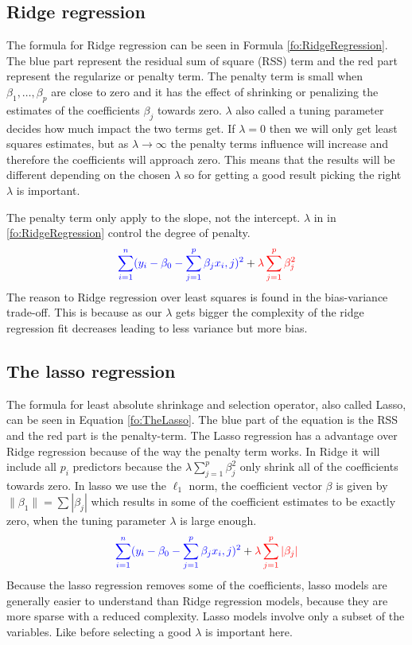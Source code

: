 \subsection{Ridge regression}
The formula for Ridge regression can be seen in Formula \ref{fo:RidgeRegression}. The blue part represent the residual sum of square (RSS) term and the red part represent the regularize or penalty term. The penalty term is small when $\beta_1, \ldots ,\beta_p$ are close to zero and it has the effect of shrinking or penalizing the estimates of the coefficients $\beta_j$ towards zero. $\lambda$ also called a tuning parameter decides how much impact the two terms get. If $\lambda = 0$ then we will only get least squares estimates, but as $ \lambda \to \infty$ the penalty terms influence will increase and therefore the coefficients will approach zero. This means that the results will be different depending on the chosen $\lambda$ so for getting a good result picking the right $\lambda$ is important.

\noindent The penalty term only apply to the slope, not the intercept. $\lambda$ in in \ref{fo:RidgeRegression} control the degree of penalty.
\begin{align}\label{fo:RidgeRegression}
\color{blue} \sum_{i=1}^{n} ( y_i - \beta_0 - \sum_{j=1}^{p} \beta_j x_i,j )^2 \color{black} + \color{red} \lambda \sum_{j=1}^{p} \beta^2_j 
\end{align}
The reason to Ridge regression over least squares is found in the bias-variance
trade-off. This is because as our $\lambda$ gets bigger the complexity of the ridge regression fit decreases leading to less variance but more bias.

\subsection{The lasso regression}
The formula for least absolute shrinkage and selection operator, also called Lasso, can be seen in Equation \ref{fo:TheLasso}. The blue part of the equation is the RSS and the red part is the penalty-term. The Lasso regression has a advantage over Ridge regression because of the way the penalty term works. In Ridge it will include all $p_i$ predictors because the $\lambda \sum_{j=1}^{p} \beta^2_j$ only shrink all of the coefficients towards zero. In lasso we use the $\ell_1$ norm, the coefficient vector $\beta$ is given by $ \lVert \beta_1 \rVert = \sum | \beta_j |$ which results in some of the coefficient estimates to be exactly zero, when the tuning parameter $\lambda$ is large enough.
\begin{align}\label{fo:TheLasso}
\color{blue} \sum_{i=1}^{n} ( y_i - \beta_0 - \sum_{j=1}^{p} \beta_j x_i,j )^2 \color{black} +  \color{red} \lambda \sum_{j=1}^{p} |\beta_j|
\end{align}
Because the lasso regression removes some of the coefficients, lasso models are generally easier to understand than Ridge regression models, because they are more sparse with a reduced complexity. Lasso models involve only a subset of the variables. Like before selecting a good $\lambda$ is important here.

